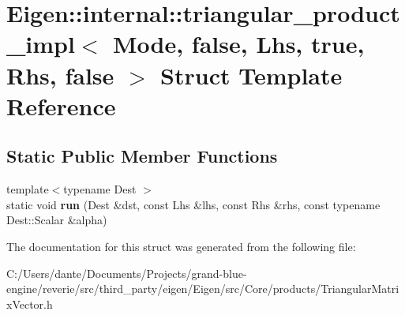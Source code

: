 \hypertarget{struct_eigen_1_1internal_1_1triangular__product__impl_3_01_mode_00_01false_00_01_lhs_00_01true_00_01_rhs_00_01false_01_4}{}\section{Eigen\+::internal\+::triangular\+\_\+product\+\_\+impl$<$ Mode, false, Lhs, true, Rhs, false $>$ Struct Template Reference}
\label{struct_eigen_1_1internal_1_1triangular__product__impl_3_01_mode_00_01false_00_01_lhs_00_01true_00_01_rhs_00_01false_01_4}
\subsection*{Static Public Member Functions}
\begin{DoxyCompactItemize}
\item 
\mbox{\label{struct_eigen_1_1internal_1_1triangular__product__impl_3_01_mode_00_01false_00_01_lhs_00_01true_00_01_rhs_00_01false_01_4_a4783a1794a39399921609a30e1827258}} 
{\footnotesize template$<$typename Dest $>$ }\\static void {\bfseries run} (Dest \&dst, const Lhs \&lhs, const Rhs \&rhs, const typename Dest\+::\+Scalar \&alpha)
\end{DoxyCompactItemize}


The documentation for this struct was generated from the following file\+:\begin{DoxyCompactItemize}
\item 
C\+:/\+Users/dante/\+Documents/\+Projects/grand-\/blue-\/engine/reverie/src/third\+\_\+party/eigen/\+Eigen/src/\+Core/products/Triangular\+Matrix\+Vector.\+h\end{DoxyCompactItemize}
